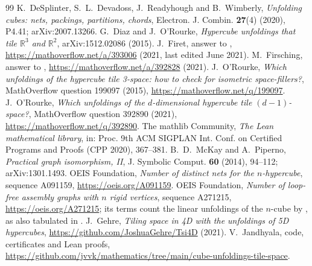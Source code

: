 \documentclass[11pt]{amsart}
\theoremstyle{definition}
\theoremstyle{remark}
\newcommand{\R}{\mathbb{R}}
\begin{document}
\begin{thebibliography}{99}
 K.~DeSplinter, S.~L.~Devadoss, J.~Readyhough and B.~Wimberly, \emph{Unfolding cubes: nets, packings, partitions, chords}, Electron. J. Combin. \textbf{27}(4) (2020), P4.41; arXiv:2007.13266.
 G.~Diaz and J.~O'Rourke, \emph{Hypercube unfoldings that tile $\R^3$ and $\R^2$}, arXiv:1512.02086 (2015).
 J.~Firet, answer to \cite{MO392890}, \url{https://mathoverflow.net/a/393006} (2021, last edited June 2021).
 M.~Firsching, answer to \cite{MO199097}, \url{https://mathoverflow.net/a/392828} (2021).
 J.~O'Rourke, \emph{Which unfoldings of the hypercube tile 3-space: how to check for isometric space-fillers?}, MathOverflow question 199097 (2015), \url{https://mathoverflow.net/q/199097}.
 J.~O'Rourke, \emph{Which unfoldings of the $d$-dimensional hypercube tile $(d-1)$-space?}, MathOverflow question 392890 (2021), \url{https://mathoverflow.net/q/392890}.
 The mathlib Community, \emph{The Lean mathematical library}, in: Proc. 9th ACM SIGPLAN Int. Conf. on Certified Programs and Proofs (CPP 2020), 367--381.
 B.~D.~McKay and A.~Piperno, \emph{Practical graph isomorphism, II}, J. Symbolic Comput. \textbf{60} (2014), 94--112; arXiv:1301.1493.
 OEIS Foundation, \emph{Number of distinct nets for the $n$-hypercube}, sequence A091159, \url{https://oeis.org/A091159}.
 OEIS Foundation, \emph{Number of loop-free assembly graphs with $n$ rigid vertices}, sequence A271215, \url{https://oeis.org/A271215}; its terms count the linear unfoldings of the $n$-cube by \cite[Table~1]{DDRW}, as also tabulated in \cite{Firet}.
 J.~Gehre, \emph{Tiling space in 4D with the unfoldings of 5D hypercubes}, \url{https://github.com/JoshuaGehre/Tsi4D} (2021).
 V.~Jandhyala, code, certificates and Lean proofs, \url{https://github.com/jvvk/mathematics/tree/main/cube-unfoldings-tile-space}.
\end{thebibliography}
\end{document}
